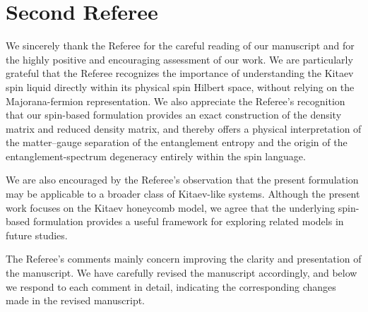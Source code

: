 \documentclass[12pt]{article}
\begin{document}

\section*{Second Referee}

We sincerely thank the Referee for the careful reading of our manuscript and for the highly positive and encouraging assessment of our work. We are particularly grateful that the Referee recognizes the importance of understanding the Kitaev spin liquid directly within its physical spin Hilbert space, without relying on the Majorana-fermion representation. We also appreciate the Referee's recognition that our spin-based formulation provides an exact construction of the density matrix and reduced density matrix, and thereby offers a physical interpretation of the matter--gauge separation of the entanglement entropy and the origin of the entanglement-spectrum degeneracy entirely within the spin language.

We are also encouraged by the Referee's observation that the present formulation may be applicable to a broader class of Kitaev-like systems. Although the present work focuses on the Kitaev honeycomb model, we agree that the underlying spin-based formulation provides a useful framework for exploring related models in future studies.

The Referee's comments mainly concern improving the clarity and presentation of the manuscript. We have carefully revised the manuscript accordingly, and below we respond to each comment in detail, indicating the corresponding changes made in the revised manuscript.
\end{document}
